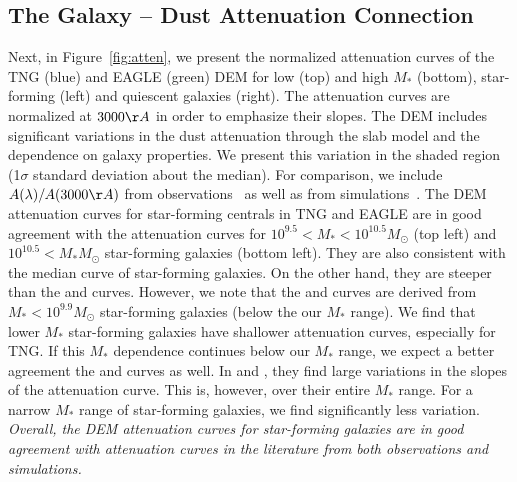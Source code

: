 \subsection{The Galaxy -- Dust Attenuation Connection}  
Next, in Figure~\ref{fig:atten}, we present the normalized attenuation curves 
of the TNG (blue) and EAGLE (green) DEM for low (top) and high $M_*$ (bottom),
star-forming (left) and quiescent galaxies (right). The attenuation curves are
normalized at $3000\AA$ in order to emphasize their slopes. The DEM includes
significant variations in the dust attenuation through the slab model
and the dependence on galaxy properties. We present this variation in the
shaded region (1$\sigma$ standard deviation about the median). For comparison,
we include $A(\lambda)/A(3000\AA)$ from observations~\citep{calzetti2000, battisti2017, salim2018} 
as well as from simulations~\citep{narayanan2018}. The DEM attenuation curves 
for star-forming centrals in TNG and EAGLE are in good agreement with the
\cite{salim2018} attenuation curves for $10^{9.5} < M_* < 10^{10.5}M_\odot$ 
(top left) and $10^{10.5} < M_*M_\odot$ star-forming galaxies (bottom
left). They are also consistent with the median curve of \cite{narayanan2018} 
star-forming galaxies. On the other hand, they are steeper than the
\cite{calzetti2000} and \cite{battisti2017} curves. However, we note that 
the \cite{calzetti2000} and \cite{battisti2017} curves are derived from
$M_* < 10^{9.9}M_\odot$ star-forming galaxies (below the our $M_*$ range).
We find that lower $M_*$ star-forming galaxies have shallower attenuation 
curves, especially for TNG. If this $M_*$ dependence continues below our $M_*$
range, we expect a better agreement the \cite{calzetti2000} and \cite{battisti2017} 
curves as well. In \cite{salim2018} and \cite{narayanan2018}, they find 
large variations in the slopes of the attenuation curve. This is, however, 
over their entire $M_*$ range. For a narrow $M_*$ range of star-forming
galaxies, we find significantly less variation. 
\emph{Overall, the DEM attenuation curves for star-forming galaxies are in good
agreement with attenuation curves in the literature from both observations and
simulations.}

